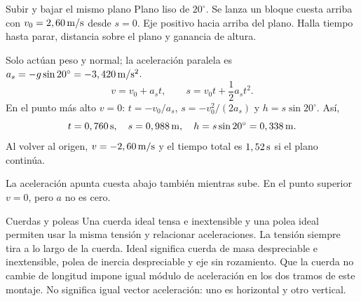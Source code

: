 \documentclass[11pt,a4paper]{article}
\begin{document}
\begin{examplebox}{Subir y bajar el mismo plano}
 Plano liso de $20^\circ$. Se lanza un bloque cuesta arriba con $v_0=2,60\,\mathrm{m/s}$ desde $s=0$. Eje positivo hacia arriba del plano. Halla tiempo hasta parar, distancia sobre el plano y ganancia de altura.
\solutionblock

 Solo act\'uan peso y normal; la aceleraci\'on paralela es $a_s=-g\sin20^\circ=-3,420\,\mathrm{m/s^2}$.
\[
v=v_0+a_st,\qquad s=v_0t+\frac12 a_st^2.
\]
 En el punto m\'as alto $v=0$:
$t=-v_0/a_s$, $s=-v_0^2/(2a_s)$ y $h=s\sin20^\circ$. As\'i,
\[
t=0,760\,\mathrm{s},\quad s=0,988\,\mathrm{m},\quad h=s\sin20^\circ=0,338\,\mathrm{m}.
\]
Al volver al origen, $v=-2,60\,\mathrm{m/s}$ y el tiempo total es $1,52\,\mathrm{s}$ si el plano contin\'ua.

 La aceleraci\'on apunta cuesta abajo tambi\'en mientras sube. En el punto superior $v=0$, pero $a$ no es cero.
\end{examplebox}

\begin{lessoncard}{Cuerdas y poleas}
Una cuerda ideal tensa e inextensible y una polea ideal permiten usar la misma tensi\'on y relacionar aceleraciones. La tensi\'on siempre tira a lo largo de la cuerda.
Ideal significa cuerda de masa despreciable e inextensible, polea de inercia
despreciable y eje sin rozamiento. Que la cuerda no cambie de longitud impone
igual m\'odulo de aceleraci\'on en los dos tramos de este montaje.
No significa igual vector aceleraci\'on: uno es horizontal y otro vertical.
\end{lessoncard}
\end{document}
